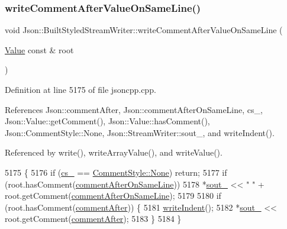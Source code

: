 \subsubsection{\texorpdfstring{write\+Comment\+After\+Value\+On\+Same\+Line()}{writeCommentAfterValueOnSameLine()}}
{\footnotesize\ttfamily void Json\+::\+Built\+Styled\+Stream\+Writer\+::write\+Comment\+After\+Value\+On\+Same\+Line (\begin{DoxyParamCaption}\item[{\hyperlink{class_json_1_1_value}{Value} const \&}]{root }\end{DoxyParamCaption})\hspace{0.3cm}{\ttfamily [private]}}



Definition at line 5175 of file jsoncpp.\+cpp.



References Json\+::comment\+After, Json\+::comment\+After\+On\+Same\+Line, cs\+\_\+, Json\+::\+Value\+::get\+Comment(), Json\+::\+Value\+::has\+Comment(), Json\+::\+Comment\+Style\+::\+None, Json\+::\+Stream\+Writer\+::sout\+\_\+, and write\+Indent().



Referenced by write(), write\+Array\+Value(), and write\+Value().


\begin{DoxyCode}
5175                                                                                 \{
5176   \textcolor{keywordflow}{if} (\hyperlink{struct_json_1_1_built_styled_stream_writer_a89a9c76c7531143b52785861ba21c1d4}{cs\_} == \hyperlink{struct_json_1_1_comment_style_a51fc08f3518fd81eba12f340d19a3d0cac8b32a8bae63414c8647d4919da8d437}{CommentStyle::None}) \textcolor{keywordflow}{return};
5177   \textcolor{keywordflow}{if} (root.hasComment(\hyperlink{namespace_json_a4fc417c23905b2ae9e2c47d197a45351a008a230a0586de54f30b76afe70fdcfa}{commentAfterOnSameLine}))
5178     *\hyperlink{class_json_1_1_stream_writer_a4f5603d4228a9fa46a42cb44e5234d9b}{sout\_} << \textcolor{stringliteral}{" "} + root.getComment(\hyperlink{namespace_json_a4fc417c23905b2ae9e2c47d197a45351a008a230a0586de54f30b76afe70fdcfa}{commentAfterOnSameLine});
5179 
5180   \textcolor{keywordflow}{if} (root.hasComment(\hyperlink{namespace_json_a4fc417c23905b2ae9e2c47d197a45351ac5784ca53b12250888ddb642b06aebef}{commentAfter})) \{
5181     \hyperlink{struct_json_1_1_built_styled_stream_writer_a2b38a3714d415c4bd3b4812897130f3d}{writeIndent}();
5182     *\hyperlink{class_json_1_1_stream_writer_a4f5603d4228a9fa46a42cb44e5234d9b}{sout\_} << root.getComment(\hyperlink{namespace_json_a4fc417c23905b2ae9e2c47d197a45351ac5784ca53b12250888ddb642b06aebef}{commentAfter});
5183   \}
5184 \}
\end{DoxyCode}
\mbox{\label{struct_json_1_1_built_styled_stream_writer_a32c4afca4e08fba79bb0a80a8010283a}} 
